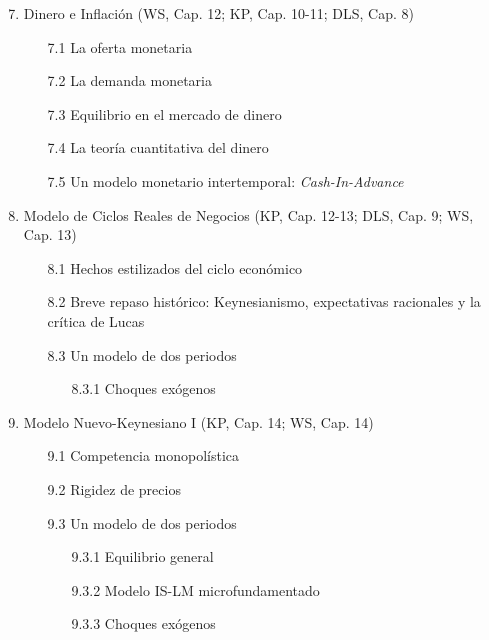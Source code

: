 \documentclass[12pt]{article}
\begin{document}
 
\begin{enumerate}
\setcounter{enumi}{6}
    \item Dinero e Inflación (WS, Cap. 12; KP, Cap. 10-11; DLS, Cap. 8)
    \begin{enumerate}
        \item[7.1] La oferta monetaria 
        \item[7.2] La demanda monetaria
        \item[7.3] Equilibrio en el mercado de dinero
        \item[7.4] La teoría cuantitativa del dinero
        \item[7.5] Un modelo monetario intertemporal: \textit{Cash-In-Advance}
    \end{enumerate}
    \item Modelo de Ciclos Reales de Negocios (KP, Cap. 12-13; DLS, Cap. 9; WS, Cap. 13)
    \begin{enumerate}
        \item[8.1] Hechos estilizados del ciclo económico
        \item[8.2] Breve repaso histórico: Keynesianismo, expectativas racionales y la crítica de Lucas
        \item[8.3] Un modelo de dos periodos
        \begin{enumerate}
            \item[8.3.1] Choques exógenos 
        \end{enumerate}
    \end{enumerate}
    \item Modelo Nuevo-Keynesiano I (KP, Cap. 14; WS, Cap. 14)
    \begin{enumerate}
        \item[9.1] Competencia monopolística
        \item[9.2] Rigidez de precios
        \item[9.3] Un modelo de dos periodos
        \begin{enumerate}
            \item[9.3.1] Equilibrio general
        \item[9.3.2] Modelo IS-LM microfundamentado
        \item[9.3.3] Choques exógenos

\end{enumerate}
\end{enumerate}
\end{enumerate}
\end{document}
